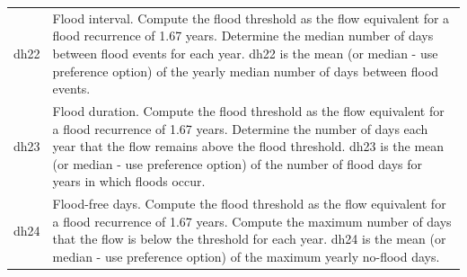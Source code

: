 \documentclass[a4paper,11pt]{article}\usepackage[]{graphicx}\usepackage[]{color}
\begin{document}
\begin{table}[ht]
\begin{threeparttable}[b]
\begin{tabularx}{\textwidth}{|l|X|}
  dh22 & Flood interval. Compute the flood threshold as the flow equivalent for a flood recurrence of 1.67 years. Determine the median number of days between flood events for each year. dh22 is the mean (or median - use preference option) of the yearly median number of days between flood events. \\
  dh23 & Flood duration. Compute the flood threshold as the flow equivalent for a flood recurrence of 1.67 years. Determine the number of days each year that the flow remains above the flood threshold. dh23 is the mean (or median - use preference option) of the number of flood days for years in which floods occur. \\
  dh24 & Flood-free days. Compute the flood threshold as the flow equivalent for a flood recurrence of 1.67 years. Compute the maximum number of days that the flow is below the threshold for each year. dh24 is the mean (or median - use preference option) of the maximum yearly no-flood days. \\
   \hline
\end{tabularx}
\end{threeparttable}
\end{table}
\end{document}
